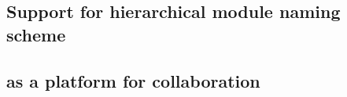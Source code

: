 
\subsection{Support for hierarchical module naming scheme}

\subsection{\easybuild{} as a platform for collaboration}
